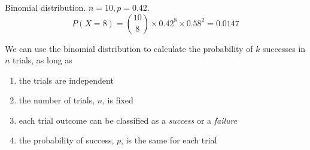 \documentclass[slidestop,compress,mathserif]{beamer}
\newcommand{\soln}[1]{\textit{\textcolor{darkGray}{#1}}}				%
\begin{document}
\begin{frame}
\frametitle{}



\pause
Binomial distribution. $n = 10, p = 0.42$.
\[
P(X = 8) = {10 \choose 8} \times 0.42^8 \times 0.58^2 = 0.0147
\]
\vfill

\pause
We can use the binomial distribution to calculate the probability of $k$ successes in $n$ trials, as long as
\pause
\begin{enumerate}
\item the trials are independent
\pause
\item the number of trials, $n$, is fixed
\pause
\item each trial outcome can be classified as a \textit{success} or a \textit{failure}
\pause
\item the probability of success, $p$, is the same for each trial
\end{enumerate}

\end{frame}
%
%
%
%
\end{document}
